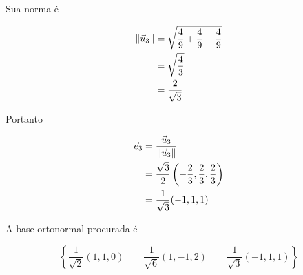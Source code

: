 \documentclass[a4paper,12pt,fleqn]{article}
\begin{document}
\begin{answer}
  Sua norma é

  \begin{align*}
    \norm{\vec{u}_3}
    & = \sqrt{
        \frac{4}{9}+\frac{4}{9}+\frac{4}{9}
      }
    \\
    & = \sqrt{\frac{4}{3}}
    \\
    & = \frac{2}{\sqrt{3}}
  \end{align*}

  Portanto

  \begin{align*}
    \vec{e}_3
    & = \frac{\vec{u}_3}{\norm{\vec{u}_3}}
    \\
    & = \frac{\sqrt{3}}{2}
      \left(-\frac{2}{3},\frac{2}{3},\frac{2}{3}\right)
    \\
    & = \frac{1}{\sqrt{3}}(-1,1,1)
  \end{align*}

  A base ortonormal procurada é

  \[
    \left\{
      \frac{1}{\sqrt{2}}(1,1,0)
      \qquad
      \frac{1}{\sqrt{6}}(1,-1,2)
      \qquad
      \frac{1}{\sqrt{3}}(-1,1,1)
    \right\}
  \]
\end{answer}

\end{document}
